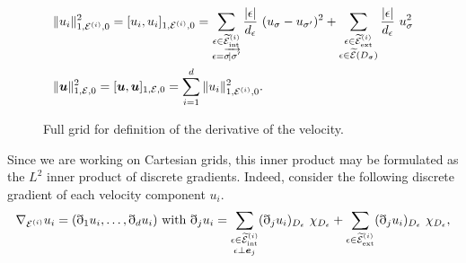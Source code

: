\documentclass{amsart}
\numberwithin{equation}{section}
\begin{document}
\begin{subequations}
  \begin{align}
  &\label{normi}
  \|{u_i}\|^2_{1,{\mathcal {E}^{(i)}},0} = [{u_i},{u_i}]_{1,{\mathcal {E}^{(i)}},0}= \sum_{\substack{{\epsilon} \in {{{\widetilde {{\mathcal E}}}^{(i)}_{{\rm int}}}}\\ {\epsilon}=\overrightarrow{{{\sigma}}\!\vert{{\sigma}}'}}} \frac{|{\epsilon}|}{d_{\epsilon}}\ (u_{{\sigma}}-u_{{{\sigma}}'})^{2}+ \sum_{\substack{{\epsilon} \in {{{\widetilde {{\mathcal E}}}^{(i)}_{{\rm ext}}}}\\ {\epsilon} \in {\widetilde {{\mathcal E}}}(D_{{\sigma}})}} \frac{|{\epsilon}|}{d_{\epsilon}}\ u_{{\sigma}}^{2}\\
  & \label{normfull}
  \|{{\boldsymbol u}}\|^2_{1,{{\mathcal E}},0} = [{{\boldsymbol u}},{{\boldsymbol u}}]_{1,{{\mathcal E}},0} = \sum_{i=1}^d \|{u_i}\|^2_{1,{\mathcal {E}^{(i)}},0}.
\end{align}
\label{norm}
\end{subequations}
\begin{figure}[tb]
\centering
{}

\caption{Full grid for definition of the derivative of the velocity.}
 \label{fig:gradient}
\end{figure}
Since we are working on Cartesian grids,  this inner product may be formulated as the $L^2$ inner product of discrete gradients. 
Indeed, consider the following discrete gradient of each velocity component $u_i$.
\begin{equation}\label{partialdiscrete}
  \nabla_{{{\mathcal E}}^{(i)}} u_i = (\eth_1 u_i, \ldots, \eth_d u_i)  \mbox{ with }
  \eth_j u_i = \sum_{\substack{{\epsilon} \in {{{\widetilde {{\mathcal E}}}^{(i)}_{{\rm int}}}} \\ {\epsilon} \perp {{\boldsymbol e}}_j}}  (\eth_j u_i)_{ D_{\epsilon}} \ \chi_{D_{\epsilon}}
  +\sum_{{\epsilon} \in {{{\widetilde {{\mathcal E}}}^{(i)}_{{\rm ext}}}}} (\eth_j u_i)_{ D_{\epsilon}} \ \chi_{D_{\epsilon}},
\end{equation}
\end{document}

